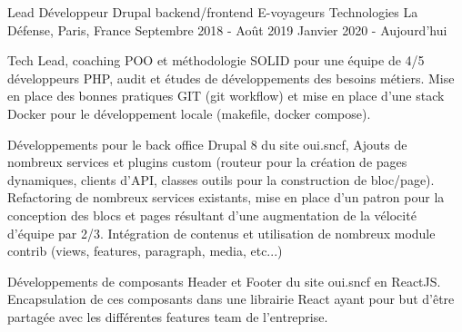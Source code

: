 \cventry
{Lead Développeur Drupal backend/frontend} %
{E-voyageurs Technologies} %
{La Défense, Paris, France} %
{Septembre 2018 - Août 2019 \newline Janvier 2020 - Aujourd'hui} %
{
\begin{cvitems} %
    \item
    {
        Tech Lead, coaching POO et méthodologie SOLID pour une équipe de 4/5 développeurs PHP, audit et études
        de développements des besoins métiers. Mise en place des bonnes pratiques GIT (git workflow) et mise en place
        d'une stack Docker pour le développement locale (makefile, docker compose).
    }
    \item
    {
        Développements pour le back office Drupal 8 du site oui.sncf, Ajouts de nombreux services et plugins custom
        (routeur pour la création de pages dynamiques, clients d’API, classes outils pour la construction de bloc/page).
        Refactoring de nombreux services existants, mise en place d’un patron pour la conception des blocs et pages
        résultant d'une augmentation de la vélocité d’équipe par 2/3. Intégration de contenus et utilisation de nombreux
        module contrib (views, features, paragraph, media, etc...)
    }
    \item
        {
        Développements de composants Header et Footer du site oui.sncf en ReactJS. Encapsulation de ces composants dans
        une librairie React ayant pour but d’être partagée avec les différentes features team de l’entreprise.
    }
\end{cvitems}
}

